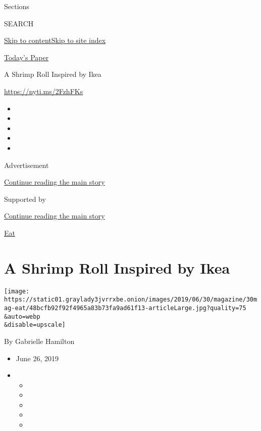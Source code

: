 Sections

SEARCH

\protect\hyperlink{site-content}{Skip to
content}\protect\hyperlink{site-index}{Skip to site index}

\href{https://myaccount.nytimes3xbfgragh.onion/auth/login?response_type=cookie\&client_id=vi}{}

\href{https://www.nytimes3xbfgragh.onion/section/todayspaper}{Today's
Paper}

A Shrimp Roll Inspired by Ikea

\url{https://nyti.ms/2FzhFKs}

\begin{itemize}
\item
\item
\item
\item
\item
\end{itemize}

Advertisement

\protect\hyperlink{after-top}{Continue reading the main story}

Supported by

\protect\hyperlink{after-sponsor}{Continue reading the main story}

\href{/column/magazine-eat}{Eat}

\hypertarget{a-shrimp-roll-inspired-by-ikea}{%
\section{A Shrimp Roll Inspired by
Ikea}\label{a-shrimp-roll-inspired-by-ikea}}

\texttt{[image: https://static01.graylady3jvrrxbe.onion/images/2019/06/30/magazine/30mag-eat/48bcfb92f92f4965a83b73fa9ad61f13-articleLarge.jpg?quality=75\\\&auto=webp\\\&disable=upscale]}

By Gabrielle Hamilton

\begin{itemize}
\item
  June 26, 2019
\item
  \begin{itemize}
  \item
  \item
  \item
  \item
  \item
  \end{itemize}
\end{itemize}

